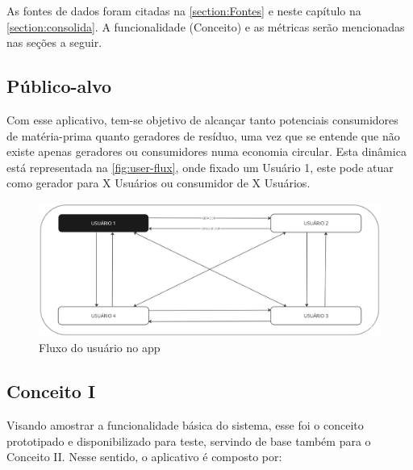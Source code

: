 As fontes de dados foram citadas na \autoref{section:Fontes} e neste capítulo na \autoref{section:consolida}. A funcionalidade (Conceito) e as métricas serão mencionadas nas seções a seguir.


\subsection{Público-alvo}

Com esse aplicativo, tem-se objetivo de alcançar tanto potenciais consumidores de matéria-prima quanto geradores de resíduo, uma vez que se entende que não existe apenas geradores ou consumidores numa economia circular. Esta dinâmica está representada na \autoref{fig:user-flux}, onde fixado um Usuário 1, este pode atuar como gerador para X Usuários ou consumidor de X Usuários.

\begin{figure}[htb]
	\caption{\label{fig:user-flux} Fluxo do usuário no app}
	\begin{center}
		\includegraphics[scale=0.38]{images/user-flux.jpg}
	\end{center}
\end{figure}

\subsection{Conceito I}

Visando amostrar a funcionalidade básica do sistema, esse foi o conceito prototipado e disponibilizado para teste, servindo de base também para o Conceito II. Nesse sentido, o aplicativo é composto por:

